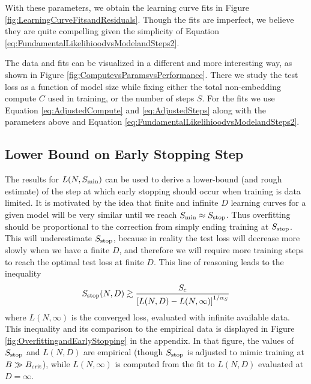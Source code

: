 \documentclass[english]{article}
\newcommand{\be}{\begin{equation}}
\newcommand{\ee}{\end{equation}}
\begin{document}
With these parameters, we obtain the learning curve fits in Figure \ref{fig:LearningCurveFitsandResiduals}.  Though the fits are imperfect, we believe they are quite compelling given the simplicity of Equation \eqref{eq:FundamentalLikelihioodvsModelandSteps2}.  

The data and fits can be visualized in a different and more interesting way, as shown in Figure \ref{fig:ComputevsParamsvsPerformance}.  There we study the test loss as a function of model size while fixing either the total non-embedding compute $C$ used in training, or the number of steps $S$.  For the fits we use Equation \eqref{eq:AdjustedCompute} and \eqref{eq:AdjustedSteps} along with the parameters above and Equation \eqref{eq:FundamentalLikelihioodvsModelandSteps2}.

\subsection{Lower Bound on Early Stopping Step}
\label{sec:EarlyStop}

The results for $L(N,S_{\rm min})$ can be used to derive a lower-bound (and rough estimate) of the step at which early stopping should occur when training is data limited.  
It is motivated by the idea that finite and infinite $D$ learning curves for a given model will be very similar until we reach $S_{\rm min} \approx S_{\rm stop}$. Thus overfitting should be proportional to the correction from simply ending  training at $S_{\rm stop}$.  This will underestimate $S_{\rm stop}$, because in reality the test loss will decrease more slowly when we have a finite $D$, and therefore we will require more training steps to reach the optimal test loss at finite $D$.  
This line of reasoning leads to the inequality
\be
\label{eq:EarlyStopInequality}
S_{\rm stop}(N,D)  \gtrsim \frac{S_c}{\left[ L(N,D) - L(N, \infty) \right]^{1 / \alpha_S}}
\ee
where $L(N, \infty)$ is the converged loss, evaluated with infinite available data.  This inequality and its comparison to the empirical data is displayed in Figure \ref{fig:OverfittingandEarlyStopping} in the appendix.  In that figure, the values of $S_{\rm stop}$ and $L(N,D)$ are empirical (though $S_{\rm stop}$ is adjusted to mimic training at $B \gg B_{\rm crit}$), while $L(N, \infty)$ is computed from the fit to $L(N,D)$ evaluated at $D=\infty$.
\end{document}
